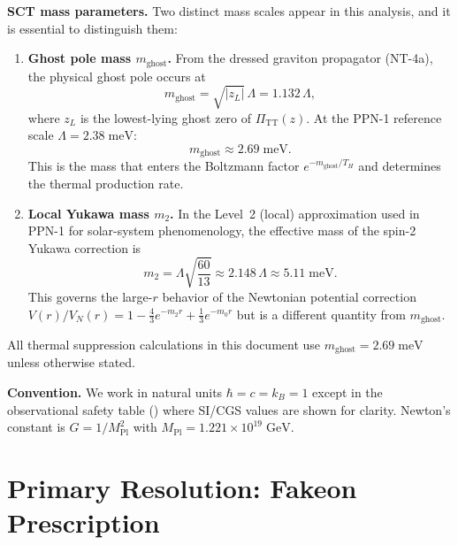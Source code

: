 \documentclass[11pt,a4paper]{article}
\newcommand{\PiTT}{\Pi_{\mathrm{TT}}}
\newcommand{\MPl}{M_{\mathrm{Pl}}}
\newcommand{\mghost}{m_{\mathrm{ghost}}}
\newcommand{\Thr}{T_{\!\scriptscriptstyle H}}
\theoremstyle{plain}
\theoremstyle{definition}
\begin{document}
\medskip\noindent
\textbf{SCT mass parameters.}  Two distinct mass scales appear in this
analysis, and it is essential to distinguish them:

\begin{enumerate}[label=(\roman*)]
  \item \textbf{Ghost pole mass $\mghost$.}  From the dressed graviton
    propagator (NT-4a), the physical ghost pole occurs at
    \begin{equation}\label{eq:mghost_def}
      \mghost = \sqrt{|z_L|}\,\Lambda = 1.132\,\Lambda,
    \end{equation}
    where $z_L$ is the lowest-lying ghost zero of $\PiTT(z)$.  At the
    PPN-1 reference scale $\Lambda = 2.38\;\mathrm{meV}$:
    \begin{equation}\label{eq:mghost_numerical}
      \mghost \approx 2.69\;\mathrm{meV}.
    \end{equation}
    This is the mass that enters the Boltzmann factor $e^{-\mghost/\Thr}$
    and determines the thermal production rate.

  \item \textbf{Local Yukawa mass $m_2$.}  In the Level~2 (local)
    approximation used in PPN-1 for solar-system phenomenology,
    the effective mass of the spin-2 Yukawa correction is
    \begin{equation}\label{eq:m2_def}
      m_2 = \Lambda\sqrt{\frac{60}{13}} \approx 2.148\,\Lambda
      \approx 5.11\;\mathrm{meV}.
    \end{equation}
    This governs the large-$r$ behavior of the Newtonian potential
    correction $V(r)/V_N(r) = 1 - \tfrac{4}{3}e^{-m_2 r}
    + \tfrac{1}{3}e^{-m_0 r}$ but is a different quantity from
    $\mghost$.
\end{enumerate}

All thermal suppression calculations in this document use
$\mghost = 2.69\;\mathrm{meV}$ unless otherwise stated.

\medskip\noindent
\textbf{Convention.}  We work in natural units $\hbar = c = k_B = 1$
except in the observational safety table ()
where SI/CGS values are shown for clarity.  Newton's constant is
$G = 1/\MPl^2$ with $\MPl = 1.221\times 10^{19}\;\mathrm{GeV}$.


\section{Primary Resolution: Fakeon Prescription}\label{sec:fakeon}
\end{document}
